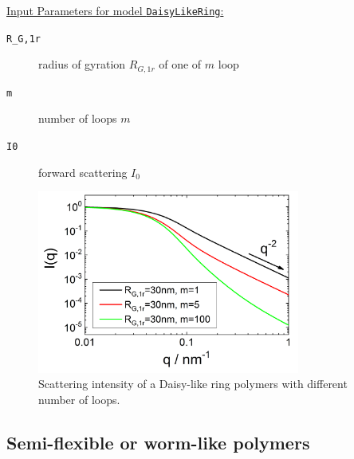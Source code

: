 \noindent
\uline{Input Parameters for model \texttt{DaisyLikeRing}:}
\begin{description}
\item[\texttt{R\_G,1r}] radius of gyration $R_{G,1r}$ of one of $m$ loop
\item[\texttt{m}]  number of loops $m$
\item[\texttt{I0}] forward scattering $I_0$
\end{description}

\begin{figure}[htb]
\begin{center}
\includegraphics[width=0.768\textwidth]{../images/form_factor/polymer_rings/DaisyRingIQ.png}
\end{center}
\caption{Scattering intensity of a Daisy-like ring polymers with different number of loops.} \label{fig:DaisyRingIQ}
\end{figure}

\clearpage
\subsection{Semi-flexible or worm-like polymers}
\label{sect:semiflexiblePolymers}
~\\

